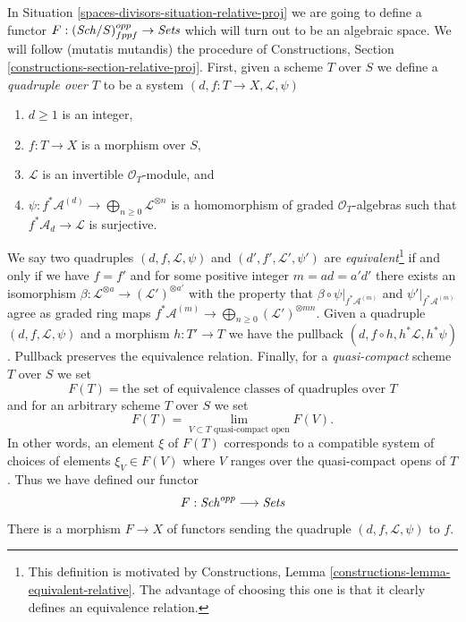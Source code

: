 In Situation \ref{spaces-divisors-situation-relative-proj} we are going to define
a functor $F : (\mathit{Sch}/S)_{fppf}^{opp} \to \textit{Sets}$ which will
turn out to be an algebraic space. We will follow (mutatis mutandis)
the procedure of
Constructions, Section \ref{constructions-section-relative-proj}.
First, given a scheme $T$ over $S$ we define a
{\it quadruple over $T$} to be a system
$(d, f : T \to X, \mathcal{L}, \psi)$
\begin{enumerate}
\item $d \geq 1$ is an integer,
\item $f : T \to X$ is a morphism over $S$,
\item $\mathcal{L}$ is an invertible $\mathcal{O}_T$-module, and
\item
$\psi : f^*\mathcal{A}^{(d)} \to \bigoplus_{n \geq 0}\mathcal{L}^{\otimes n}$
is a homomorphism of graded $\mathcal{O}_T$-algebras
such that $f^*\mathcal{A}_d \to \mathcal{L}$ is surjective.
\end{enumerate}
We say two quadruples $(d, f, \mathcal{L}, \psi)$ and
$(d', f', \mathcal{L}', \psi')$ are {\it equivalent}\footnote{This
definition is motivated by
Constructions, Lemma \ref{constructions-lemma-equivalent-relative}.
The advantage of choosing this one is that it clearly defines
an equivalence relation.}
if and only if
we have $f = f'$ and for some positive integer $m = ad = a'd'$
there exists an isomorphism
$\beta : \mathcal{L}^{\otimes a} \to (\mathcal{L}')^{\otimes a'}$
with the property that $\beta \circ \psi|_{f^*\mathcal{A}^{(m)}}$
and $\psi'|_{f^*\mathcal{A}^{(m)}}$ agree
as graded ring maps
$f^*\mathcal{A}^{(m)} \to \bigoplus_{n \geq 0} (\mathcal{L}')^{\otimes mn}$.
Given a quadruple $(d, f, \mathcal{L}, \psi)$
and a morphism $h : T' \to T$ we have the pullback
$(d, f \circ h, h^*\mathcal{L}, h^*\psi)$. Pullback preserves
the equivalence relation. Finally, for a {\it quasi-compact} scheme $T$
over $S$ we set
$$
F(T) = \text{the set of equivalence classes of quadruples over }T
$$
and for an arbitrary scheme $T$ over $S$ we set
$$
F(T)
=
\lim_{V \subset T\text{ quasi-compact open}} F(V).
$$
In other words, an element $\xi$ of $F(T)$ corresponds to a compatible
system of choices of elements $\xi_V \in F(V)$ where $V$ ranges over the
quasi-compact opens of $T$. Thus we have defined our functor
\begin{equation}
\label{equation-proj}
F : \mathit{Sch}^{opp} \longrightarrow \textit{Sets}
\end{equation}
There is a morphism $F \to X$ of functors sending the quadruple
$(d, f, \mathcal{L}, \psi)$ to $f$.

